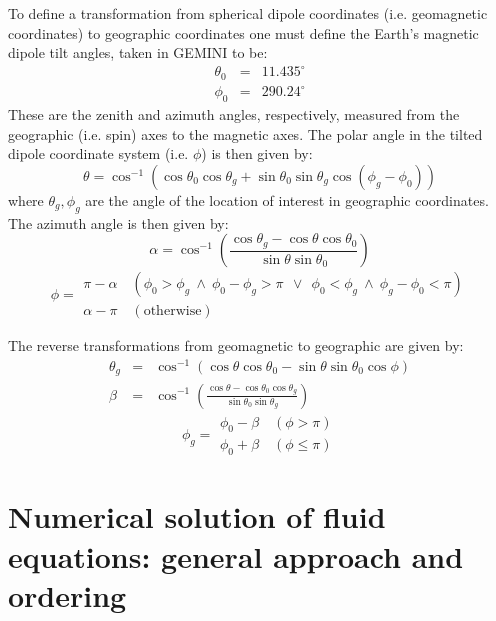 \documentclass[11pt,letterpaper]{article}
\begin{document}
To define a transformation from spherical dipole coordinates (i.e. geomagnetic coordinates) to geographic coordinates one must define the Earth's magnetic dipole tilt angles, taken in GEMINI to be:  
\begin{eqnarray}
\theta_0 &=& 11.435^\circ \nonumber \\
\phi_0 &=& 290.24^\circ \nonumber
\end{eqnarray}
These are the zenith and azimuth angles, respectively, measured from the geographic (i.e. spin) axes to the magnetic axes.  The polar angle in the tilted dipole coordinate system (i.e. $\phi$) is then given by:
\begin{equation}
\theta = \cos^{-1} \left( \cos \theta_0 \cos \theta_g + \sin \theta_0 \sin \theta_g \cos \left( \phi_g - \phi_0 \right) \right)
\end{equation}
where $\theta_g,\phi_g$ are the angle of the location of interest in geographic coordinates.  The azimuth angle is then given by:  
\begin{equation}
\alpha = \cos^{-1} \left( \frac{ \cos \theta_g - \cos \theta \cos \theta_0 }{\sin \theta \sin \theta_0} \right)
\end{equation} 
\begin{equation}
\phi= 
\begin{array}{c}
\pi - \alpha \quad (\phi_0 > \phi_g ~\land~ \phi_0-\phi_g > \pi ~~\lor~~ \phi_0 < \phi_g ~\land~ \phi_g - \phi_0 < \pi) \\
\alpha - \pi \quad (\mathrm{otherwise})
\end{array}
\end{equation}

The reverse transformations from geomagnetic to geographic are given by:  
\begin{eqnarray}
\theta_g &=& \cos^{-1} \left( \cos \theta \cos \theta_0 - \sin \theta \sin \theta_0 \cos \phi \right) \\
\beta &=& \cos^{-1} \left( \frac{\cos \theta - \cos \theta_0 \cos \theta_g}{\sin \theta_0 \sin \theta_g} \right)
\end{eqnarray}
\begin{equation}
\phi_g= 
\begin{array}{c}
\phi_0 - \beta \quad (\phi > \pi) \\
\phi_0 + \beta \quad (\phi \le \pi)
\end{array}
\end{equation}


\section{Numerical solution of fluid equations:  general approach and ordering}
\end{document}
